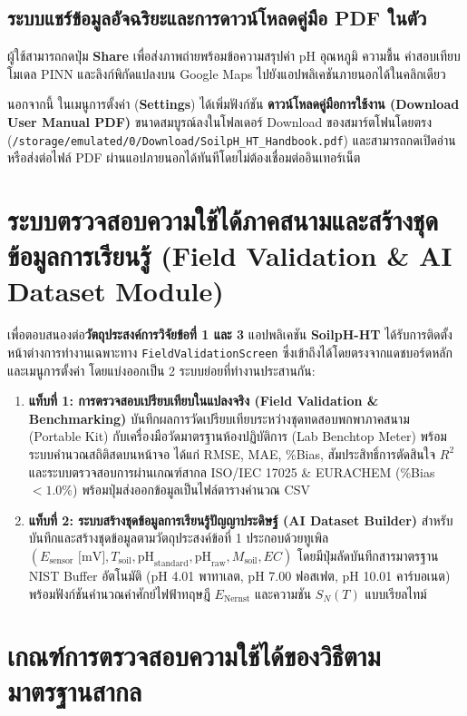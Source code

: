 \subsection{ระบบแชร์ข้อมูลอัจฉริยะและการดาวน์โหลดคู่มือ PDF ในตัว}
ผู้ใช้สามารถกดปุ่ม \textbf{Share} เพื่อส่งภาพถ่ายพร้อมข้อความสรุปค่า pH อุณหภูมิ ความชื้น ค่าสอบเทียบโมเดล PINN และลิงก์พิกัดแปลงบน Google Maps ไปยังแอปพลิเคชันภายนอกได้ในคลิกเดียว

นอกจากนี้ ในเมนูการตั้งค่า (\textbf{Settings}) ได้เพิ่มฟังก์ชัน \textbf{ดาวน์โหลดคู่มือการใช้งาน (Download User Manual PDF)} ขนาดสมบูรณ์ลงในโฟลเดอร์ Download ของสมาร์ตโฟนโดยตรง (\texttt{/storage/emulated/0/Download/SoilpH\_HT\_Handbook.pdf}) และสามารถกดเปิดอ่านหรือส่งต่อไฟล์ PDF ผ่านแอปภายนอกได้ทันทีโดยไม่ต้องเชื่อมต่ออินเทอร์เน็ต

\section{ระบบตรวจสอบความใช้ได้ภาคสนามและสร้างชุดข้อมูลการเรียนรู้ (Field Validation \& AI Dataset Module)}

เพื่อตอบสนองต่อ\textbf{วัตถุประสงค์การวิจัยข้อที่ 1 และ 3} แอปพลิเคชัน \textbf{SoilpH-HT} ได้รับการติดตั้งหน้าต่างการทำงานเฉพาะทาง \texttt{FieldValidationScreen} ซึ่งเข้าถึงได้โดยตรงจากแดชบอร์ดหลักและเมนูการตั้งค่า โดยแบ่งออกเป็น 2 ระบบย่อยที่ทำงานประสานกัน:

\begin{enumerate}
    \item \textbf{แท็บที่ 1: การตรวจสอบเปรียบเทียบในแปลงจริง (Field Validation \& Benchmarking)}
    บันทึกผลการวัดเปรียบเทียบระหว่างชุดทดสอบพกพาภาคสนาม (Portable Kit) กับเครื่องมือวัดมาตรฐานห้องปฏิบัติการ (Lab Benchtop Meter) พร้อมระบบคำนวณสถิติสดบนหน้าจอ ได้แก่ RMSE, MAE, \%Bias, สัมประสิทธิ์การตัดสินใจ $R^2$ และระบบตรวจสอบการผ่านเกณฑ์สากล ISO/IEC 17025 \& EURACHEM (\%Bias $< 1.0\%$) พร้อมปุ่มส่งออกข้อมูลเป็นไฟล์ตารางคำนวณ CSV
    \item \textbf{แท็บที่ 2: ระบบสร้างชุดข้อมูลการเรียนรู้ปัญญาประดิษฐ์ (AI Dataset Builder)}
    สำหรับบันทึกและสร้างชุดข้อมูลตามวัตถุประสงค์ข้อที่ 1 ประกอบด้วยทูเพิล $(E_{\text{sensor}}\text{ [mV]}, T_{\text{soil}}, \text{pH}_{\text{standard}}, \text{pH}_{\text{raw}}, M_{\text{soil}}, EC)$ โดยมีปุ่มลัดบันทึกสารมาตรฐาน NIST Buffer อัตโนมัติ (pH 4.01 พาทาเลต, pH 7.00 ฟอสเฟต, pH 10.01 คาร์บอเนต) พร้อมฟังก์ชันคำนวณค่าศักย์ไฟฟ้าทฤษฎี $E_{\text{Nernst}}$ และความชัน $S_N(T)$ แบบเรียลไทม์
\end{enumerate}

\section{เกณฑ์การตรวจสอบความใช้ได้ของวิธีตามมาตรฐานสากล}

